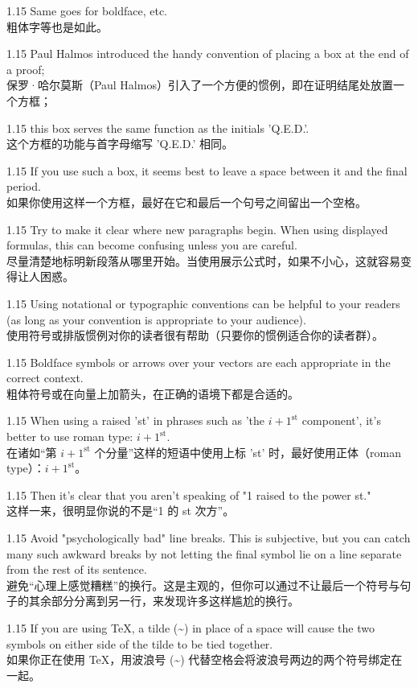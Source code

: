 \documentclass[12pt,a4paper]{article}
\newcommand{\bilingual}[2]{
    \begin{spacing}{1.15} %
        \noindent \normalsize #1 \\[-0.5ex] %
        \small \textcolor{blue!70!black}{#2} %
    \end{spacing}
    \vspace{0.8em} %
}
\begin{document}
\bilingual{Same goes for boldface, etc.}
{粗体字等也是如此。} %

\bilingual{Paul Halmos introduced the handy convention of placing a box at the end of a proof;}
{保罗·哈尔莫斯（Paul Halmos）引入了一个方便的惯例，即在证明结尾处放置一个方框；} %

\bilingual{this box serves the same function as the initials 'Q.E.D.'.}
{这个方框的功能与首字母缩写 'Q.E.D.' 相同。} %

\bilingual{If you use such a box, it seems best to leave a space between it and the final period.}
{如果你使用这样一个方框，最好在它和最后一个句号之间留出一个空格。} %

\bilingual{Try to make it clear where new paragraphs begin. When using displayed formulas, this can become confusing unless you are careful.}
{尽量清楚地标明新段落从哪里开始。当使用展示公式时，如果不小心，这就容易变得让人困惑。} %

\bilingual{Using notational or typographic conventions can be helpful to your readers (as long as your convention is appropriate to your audience).}
{使用符号或排版惯例对你的读者很有帮助（只要你的惯例适合你的读者群）。} %

\bilingual{Boldface symbols or arrows over your vectors are each appropriate in the correct context.}
{粗体符号或在向量上加箭头，在正确的语境下都是合适的。} %

\bilingual{When using a raised 'st' in phrases such as 'the $i+1^{\mathrm{st}}$ component', it's better to use roman type: $i+1^{\mathrm{st}}$.}
{在诸如“第 $i+1^{\mathrm{st}}$ 个分量”这样的短语中使用上标 'st' 时，最好使用正体（roman type）：$i+1^{\mathrm{st}}$。} %

\bilingual{Then it's clear that you aren't speaking of "1 raised to the power st."}
{这样一来，很明显你说的不是“1 的 st 次方”。} %

\bilingual{Avoid "psychologically bad" line breaks. This is subjective, but you can catch many such awkward breaks by not letting the final symbol lie on a line separate from the rest of its sentence.}
{避免“心理上感觉糟糕”的换行。这是主观的，但你可以通过不让最后一个符号与句子的其余部分分离到另一行，来发现许多这样尴尬的换行。} %

\bilingual{If you are using \TeX, a tilde (\textasciitilde) in place of a space will cause the two symbols on either side of the tilde to be tied together.}
{如果你正在使用 \TeX，用波浪号 (\textasciitilde) 代替空格会将波浪号两边的两个符号绑定在一起。} %
\end{document}
